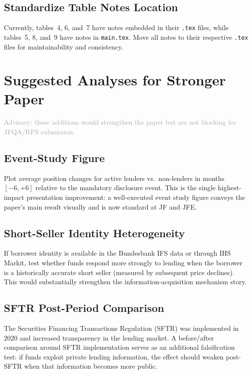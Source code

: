 \documentclass[11pt, a4paper]{article}
\begin{document}
\subsection{Standardize Table Notes Location}

Currently, tables~4, 6, and~7 have notes embedded in their \texttt{.tex} files, while
tables~5, 8, and~9 have notes in \texttt{main.tex}. Move all notes to their respective
\texttt{.tex} files for maintainability and consistency.

\section{Suggested Analyses for Stronger Paper}

\textcolor{darkgray}{Advisory: these additions would strengthen the paper but are not blocking
for JFQA/RFS submission.}

\subsection{Event-Study Figure}

Plot average position changes for active lenders vs.\ non-lenders in months $[-6, +6]$
relative to the mandatory disclosure event. This is the single highest-impact presentation
improvement: a well-executed event study figure conveys the paper's main result visually and
is now standard at JF and JFE.

\subsection{Short-Seller Identity Heterogeneity}

If borrower identity is available in the Bundesbank IFS data or through IHS Markit, test
whether funds respond more strongly to lending when the borrower is a historically accurate
short seller (measured by subsequent price declines). This would substantially strengthen the
information-acquisition mechanism story.

\subsection{SFTR Post-Period Comparison}

The Securities Financing Transactions Regulation (SFTR) was implemented in 2020 and increased
transparency in the lending market. A before/after comparison around SFTR implementation
serves as an additional falsification test: if funds exploit private lending information, the
effect should weaken post-SFTR when that information becomes more public.
\end{document}
